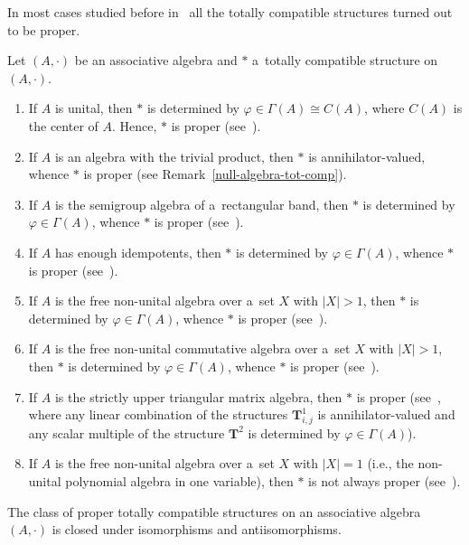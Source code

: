 \documentclass{jonasart}
\newcommand{\G}{\Gamma}
\newcommand{\vf}{\varphi}
\begin{document}
	In most cases studied before in~\cite{Khr2024,Khr2024b} all the totally compatible structures turned out to be proper.
	\begin{example}
		Let $(A,\cdot)$ be an associative algebra and $*$ a~totally compatible structure on $(A,\cdot)$.
		\begin{enumerate}
			\item If $A$ is unital, then $*$ is determined by $\vf\in\G(A)\cong C(A)$, where $C(A)$ is the center of $A$. Hence, $*$ is proper (see~\cite[Proposition~2.6]{Khr2024}).
			\item If $A$ is an algebra with the trivial product, then $*$ is annihilator-valued, whence $*$ is proper (see Remark~\ref{null-algebra-tot-comp}).
			\item If $A$ is the semigroup algebra of a~rectangular band, then $*$ is determined by $\vf\in\G(A)$, whence $*$ is proper (see~\cite[Proposition~3.11]{Khr2024}).
			\item If $A$ has enough idempotents, then $*$ is determined by $\vf\in\G(A)$, whence $*$ is proper (see~\cite[Proposition 3.23]{Khr2024}).
			\item If $A$ is the free non-unital algebra over a~set $X$ with $|X|>1$, then $*$ is determined by $\vf\in\G(A)$, whence $*$ is proper (see~\cite[Proposition~4.6]{Khr2024}).
			\item If $A$ is the free non-unital commutative algebra over a~set $X$ with $|X|>1$, then $*$ is determined by $\vf\in\G(A)$, whence $*$ is proper (see~\cite[Proposition~4.12]{Khr2024}).
			\item If $A$ is the strictly upper triangular matrix algebra, then $*$ is proper (see~\cite[Theorem~5.1]{Khr2024b}, where any linear combination of the structures $\mathbf{T}_{i,j}^1$ is annihilator-valued and any scalar multiple of the structure $\mathbf{T}^2$ is determined by $\vf\in\G(A)$).
			\item If $A$ is the free non-unital algebra over a~set $X$ with $|X|=1$ (i.e., the non-unital polynomial algebra in one variable), then $*$ is not always proper (see~\cite[Remark~4.10]{Khr2024}).
		\end{enumerate}
	\end{example}

	\begin{proposition}\label{proper-tot-comp-closed-by-iso-and-antiiso}
		The class of proper totally compatible structures on an associative algebra $(A,\cdot)$ is closed under isomorphisms and antiisomorphisms.
	\end{proposition}
\end{document}
